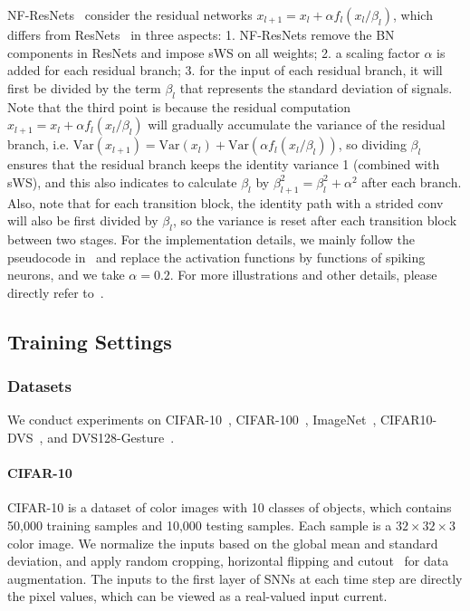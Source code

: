 \documentclass{article}
\begin{document}
NF-ResNets~\cite{brock2021characterizing} consider the residual networks $x_{l+1}=x_l+\alpha f_l(x_l/\beta_l)$, which differs from ResNets~\cite{he2016identity} in three aspects: 1. NF-ResNets remove the BN components in ResNets and impose sWS on all weights; 2. a scaling factor $\alpha$ is added for each residual branch; 3. for the input of each residual branch, it will first be divided by the term $\beta_l$ that represents the standard deviation of signals. Note that the third point is because the residual computation $x_{l+1}=x_l+\alpha f_l(x_l/\beta_l)$ will gradually accumulate the variance of the residual branch, i.e. $\text{Var}(x_{l+1})=\text{Var}(x_l)+\text{Var}(\alpha f_l(x_l/\beta_l))$, so dividing $\beta_l$ ensures that the residual branch keeps the identity variance 1 (combined with sWS), and this also indicates to calculate $\beta_l$ by $\beta_{l+1}^2=\beta_l^2+\alpha^2$ after each branch. Also, note that for each transition block, the identity path with a strided conv will also be first divided by $\beta_l$, so the variance is reset after each transition block between two stages. For the implementation details, we mainly follow the pseudocode in~\cite{brock2021characterizing} and replace the activation functions by functions of spiking neurons, and we take $\alpha=0.2$. For more illustrations and other details, please directly refer to~\cite{brock2021characterizing}.

\subsection{Training Settings}

\subsubsection{Datasets}

We conduct experiments on CIFAR-10~\cite{krizhevsky2009learning}, CIFAR-100~\cite{krizhevsky2009learning}, ImageNet~\cite{deng2009imagenet},  CIFAR10-DVS~\cite{li2017cifar10}, and DVS128-Gesture~\cite{amir2017low}.

\paragraph{CIFAR-10} CIFAR-10 is a dataset of color images with 10 classes of objects, which contains 50,000 training samples and 10,000 testing samples. Each sample is a $32\times32\times3$ color image. We normalize the inputs based on the global mean and standard deviation, and apply random cropping, horizontal flipping and cutout~\cite{devries2017improved} for data augmentation. The inputs to the first layer of SNNs at each time step are directly the pixel values, which can be viewed as a real-valued input current.
\end{document}
